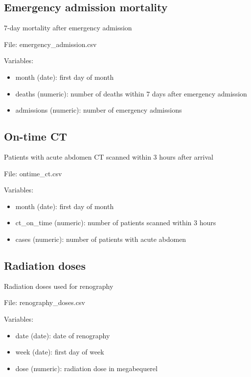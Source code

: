 \documentclass[
]{book}
\providecommand{\tightlist}{%
  \setlength{\itemsep}{0pt}\setlength{\parskip}{0pt}}
\begin{document}
\subsection*{Emergency admission
mortality}\label{emergency-admission-mortality}

7-day mortality after emergency admission

File: emergency\_admission.csv

Variables:

\begin{itemize}
\tightlist
\item
  month (date): first day of month
\item
  deaths (numeric): number of deaths within 7 days after emergency
  admission
\item
  admissions (numeric): number of emergency admissions
\end{itemize}

\subsection*{On-time CT}\label{on-time-ct}

Patients with acute abdomen CT scanned within 3 hours after arrival

File: ontime\_ct.csv

Variables:

\begin{itemize}
\tightlist
\item
  month (date): first day of month
\item
  ct\_on\_time (numeric): number of patients scanned within 3 hours
\item
  cases (numeric): number of patients with acute abdomen
\end{itemize}

\subsection*{Radiation doses}\label{radiation-doses}

Radiation doses used for renography

File: renography\_doses.csv

Variables:

\begin{itemize}
\tightlist
\item
  date (date): date of renography
\item
  week (date): first day of week
\item
  dose (numeric): radiation dose in megabequerel
\end{itemize}
\end{document}
